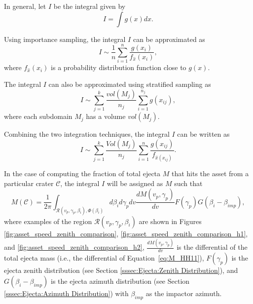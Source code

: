 \documentclass{article}
\begin{document}
In general, let $I$ be the integral given by
\begin{equation}
I = \int g(x)dx.
\end{equation}

Using importance sampling, the integral $I$ can be approximated as
\begin{equation}
I \sim \frac{1}{n}\sum_{i=1}^{n}\frac{g(x_i)}{f_{\hat{x}}(x_i)},
\end{equation}
where $f_{\hat{x}}(x_i)$ is a probability distribution function close to $g(x)$.

The integral $I$ can also be approximated using stratified sampling as
\begin{equation}
I \sim \sum_{j=1}^{k}\frac{vol(M_j)}{n_j}\sum_{i=1}^{n_j}g(x_{ij}),
\end{equation}
where each subdomain $M_j$ has a volume $vol(M_j)$.

Combining the two integration techniques, the integral $I$ can be written as
\begin{equation}
I \sim \sum_{j=1}^{k}\frac{Vol(M_j)}{n_j}\sum_{i=1}^{n}\frac{g(x_{ij})}{f_{\hat{x}(x_{ij})}}.
\end{equation}


In the case of computing the fraction of total ejecta $M$ that hits the asset from a particular crater $\mathcal{C}$, the integral $I$ will be assigned as $M$ such that
\begin{equation}
M(\mathcal{C}) = \frac{1}{2\pi}\int_{\mathcal{R}(v_p,\gamma_p, \beta_i), \Phi(\beta_i)} d\beta_i d\gamma_p dv \frac{dM(v_p,\gamma_p)}{dv} F(\gamma_p) G(\beta_i-\beta_{imp}),
\end{equation}
where examples of the region $\mathcal{R}(v_p,\gamma_p, \beta_i)$ are shown in Figures \ref{fig:asset_speed_zenith_comparison}, \ref{fig:asset_speed_zenith_comparison_h1}, and \ref{fig:asset_speed_zenith_comparison_h2}, $\frac{dM(v_p,\gamma_p)}{dv}$ is the differential of the total ejecta mass (i.e., the differential of Equation~\eqref{eq:M_HH11}), $F(\gamma_p)$ is the ejecta zenith distribution (see Section \ref{sssec:Ejecta:Zenith Distribution}), and $G(\beta_i-\beta_{imp})$ is the ejecta azimuth distribution (see Section \ref{sssec:Ejecta:Azimuth Distribution}) with $\beta_{imp}$ as the impactor azimuth.
\end{document}
